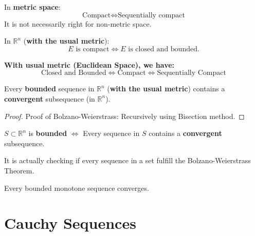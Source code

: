 \begin{proposition}
    In \textbf{metric space}: \begin{equation*}
        \text{Compact} \iff \text{Sequentially compact}
    \end{equation*}
    It is not necessarily right for non-metric space.
\end{proposition}

\begin{theorem}
    In $\mathbb{R}^{n}$ (\textbf{with the usual metric}): \begin{equation*}
        E \text{ is compact} \iff E \text{ is closed and bounded}.
    \end{equation*}
\end{theorem}

\begin{remark*}
    \textbf{With usual metric (Euclidean Space), we have:}
    \[
       \text{Closed and Bounded} \iff \text{Compact} \iff \text{Sequentially Compact}
    \]
\end{remark*}

\begin{theorem}
    Every \textbf{bounded} sequence in $\mathbb{R}^{n}$ (\textbf{with the usual metric}) contains a \textbf{convergent} subsequence (in $\mathbb{R}^{n}$).
\end{theorem}

\begin{proof} Proof of Bolzano-Weierstrass:
    Recursively using Bisection method.
\end{proof}

\begin{proposition}
    $S \subset \mathbb{R}^{n}$ is \textbf{bounded} $\iff$ Every sequence in $S$ contains a \textbf{convergent} subsequence.

    \begin{remark*}
        It is actually checking if every sequence in a set fulfill the Bolzano-Weierstrass Theorem.
    \end{remark*}
\end{proposition}

\begin{theorem}
    Every bounded monotone sequence converges.
\end{theorem}

\section{Cauchy Sequences}

